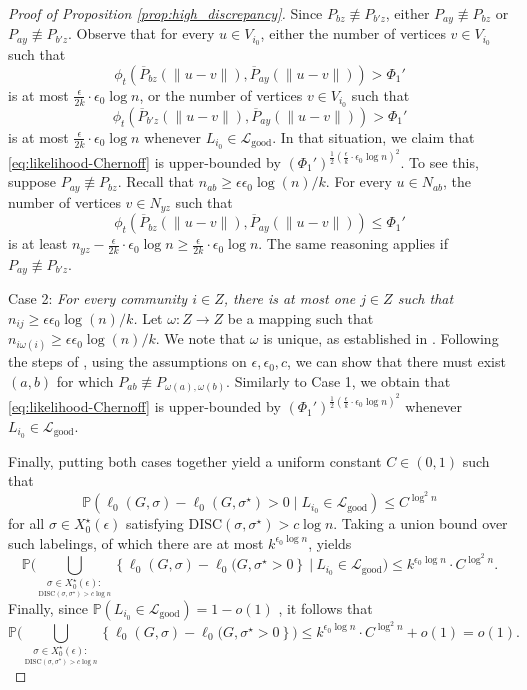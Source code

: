 \documentclass{article}
\newcommand{\1}{\mathbbm{1}}
\theoremstyle{definition}
\theoremstyle{plain}
\begin{document}
\begin{proof}[Proof of Proposition \ref{prop:high_discrepancy}]
Since $P_{bz} \not \equiv P_{b'z}$, either $P_{ay} \not \equiv P_{bz}$ or $P_{ay} \not \equiv P_{b'z}$. Observe that for every $u \in V_{i_0}$, either the number of vertices $v \in V_{i_0}$ such that 
\[\phi_t(\overline{P}_{bz}(\|u-v\|), \overline{P}_{ay}(\|u-v\|)) > \Phi_1'\]
is at most $\frac{\epsilon}{2k} \cdot \epsilon_0 \log n$,
or the number of vertices $v \in V_{i_0}$ such that
\[\phi_t(\overline{P}_{b'z}(\|u-v\|), \overline{P}_{ay}(\|u-v\|)) > \Phi_1'\]
is at most $\frac{\epsilon}{2k} \cdot \epsilon_0 \log n$ whenever $L_{i_0} \in \mathcal{L}_{\text{good}}$. In that situation, we claim that \eqref{eq:likelihood-Chernoff} is upper-bounded by $(\Phi_1')^{\frac{1}{2}\left(\frac{\epsilon}{k} \cdot \epsilon_0 \log n \right)^2}$. To see this, suppose $P_{ay} \not \equiv P_{bz}$. Recall that $n_{ab} \geq \epsilon \epsilon_0 \log(n)/k$. For every $u \in N_{ab}$, the number of vertices $v \in N_{yz}$ such that \[\phi_t(\overline{P}_{bz}(\|u-v\|), \overline{P}_{ay}(\|u-v\|)) \leq \Phi_1'\]
is at least $n_{yz} - \frac{\epsilon}{2k} \cdot \epsilon_0 \log n \geq \frac{\epsilon}{2k} \cdot \epsilon_0 \log n$. The same reasoning applies if $P_{ay} \not \equiv P_{b'z}$.

Case 2: \textit{For every community $i \in Z$, there is at most one $j \in Z$ such that $n_{ij} \geq \epsilon \epsilon_0 \log (n)/k$.} Let $\omega : Z \to Z$ be a mapping such that $n_{i \omega(i)} \geq \epsilon \epsilon_0 \log (n) /k$. We note that $\omega$ is unique, as established in \cite[Proposition D.6]{Gaudio+2025}. Following the steps of \cite[Proposition D.6]{Gaudio+2025}, using the assumptions on $\epsilon, \epsilon_0, c$, we can show that there must exist $(a,b)$ for which $P_{ab} \not \equiv P_{\omega(a), \omega(b)}$. Similarly to Case 1, we obtain that \eqref{eq:likelihood-Chernoff} is upper-bounded by $(\Phi_1')^{\frac{1}{2}\left(\frac{\epsilon}{k} \cdot \epsilon_0 \log n \right)^2}$ whenever $L_{i_0} \in \mathcal{L}_{\text{good}}$.

Finally, putting both cases together yield a uniform constant $C \in (0,1)$ such that
\[\mathbb{P}(\ell_0(G,\sigma) -\ell_0(G, \sigma^{\star}) > 0 \mid L_{i_0} \in \mathcal{L}_{\text{good}}) \leq C^{\log^2 n}\]
for all $\sigma \in X_0^{\star}(\epsilon)$ satisfying $\text{DISC}(\sigma, \sigma^{\star}) > c \log n$. Taking a union bound over such labelings, of which there are at most $k^{\epsilon_0 \log n}$, yields
\[\mathbb{P}\Bigg(\bigcup_{\underset{ \text{DISC}(\sigma, \sigma^{\star}) > c \log n}{\sigma \in X_0^{\star}(\epsilon) :}} \left\{\ell_0(G,\sigma) - \ell_0(G, \sigma^{\star} > 0 \right\} \: \bigg| \: L_{i_0} \in \mathcal{L}_{\text{good}}\Bigg) \leq k^{\epsilon_0 \log n} \cdot C^{\log^2 n}. \]
Finally, since $\mathbb{P}(L_{i_0} \in \mathcal{L}_{\text{good}}) = 1-o(1)$
, it follows that
\[\mathbb{P}\Bigg(\bigcup_{\underset{ \text{DISC}(\sigma, \sigma^{\star}) > c \log n}{\sigma \in X_0^{\star}(\epsilon) :}} \left\{\ell_0(G,\sigma) - \ell_0(G, \sigma^{\star} > 0 \right\} \Bigg) \leq k^{\epsilon_0 \log n} \cdot C^{\log^2 n} + o(1) = o(1). \]
\end{proof}
\end{document}
